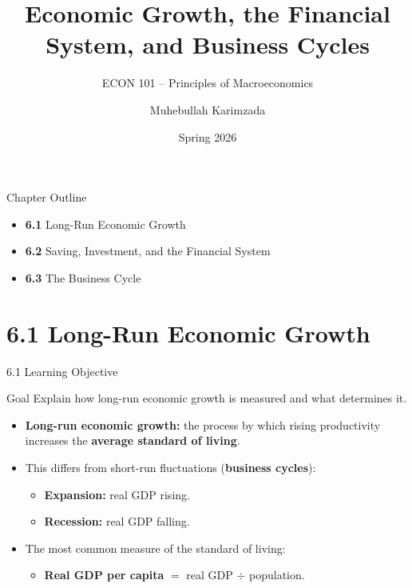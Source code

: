 \documentclass[aspectratio=169]{beamer}
\title{\textbf{Economic Growth, the Financial System, and Business Cycles}}
\subtitle{{\large ECON 101 -- Principles of Macroeconomics}}
\author{Muhebullah Karimzada}
\date{Spring 2026}
\begin{document}

\begin{frame}[plain]
  \titlepage
\end{frame}

\begin{frame}{Chapter Outline}
\transfade
\begin{itemize}[<+->]
  \item \textbf{6.1} Long-Run Economic Growth
  \item \textbf{6.2} Saving, Investment, and the Financial System
  \item \textbf{6.3} The Business Cycle
\end{itemize}
\end{frame}

\section{6.1 Long-Run Economic Growth}

\begin{frame}{6.1 Learning Objective}
\transfade
\begin{block}{Goal}
Explain how long-run economic growth is measured and what determines it.
\end{block}
\begin{itemize}[<+->]
  \item \textbf{Long-run economic growth:} the process by which rising \alert{productivity} increases the \textbf{average standard of living}.
  \item This differs from short-run fluctuations (\textbf{business cycles}):
  \begin{itemize}[<+->]
    \item \textbf{Expansion:} real GDP rising.
    \item \textbf{Recession:} real GDP falling.
  \end{itemize}
  \item The most common measure of the standard of living:
  \begin{itemize}[<+->]
    \item \textbf{Real GDP per capita} $=$ real GDP $\div$ population.
  \end{itemize}
\end{itemize}
\end{frame}
\end{document}
